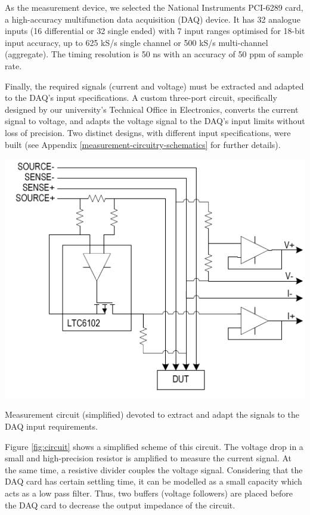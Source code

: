 \documentclass[twoside,nohyper]{tufte-book}
\theoremstyle{definition}
\theoremstyle{definition}
\theoremstyle{definition}
\theoremstyle{remark}
\begin{document}
As the measurement device, we selected the National Instruments PCI-6289
card, a high-accuracy multifunction data acquisition (DAQ) device. It
has 32 analogue inputs (16 differential or 32 single ended) with 7 input
ranges optimised for 18-bit input accuracy, up to 625 kS/s single
channel or 500 kS/s multi-channel (aggregate). The timing resolution is
50 ns with an accuracy of 50 ppm of sample rate.

Finally, the required signals (current and voltage) must be extracted
and adapted to the DAQ's input specifications. A custom three-port
circuit, specifically designed by our university's Technical Office in
Electronics, converts the current signal to voltage, and adapts the
voltage signal to the DAQ's input limits without loss of precision. Two
distinct designs, with different input specifications, were built (see
Appendix \ref{measurement-circuitry-schematics} for further details).




\begin{marginfigure}[-1cm]

{\centering \includegraphics[width=1\linewidth]{img/03/circuit} 

}

\caption[Measurement circuit (simplified) devoted to extract and
adapt the signals to the DAQ input requirements.]{Measurement circuit (simplified) devoted to extract and
adapt the signals to the DAQ input requirements.}\label{fig:circuit}
\end{marginfigure}

Figure \ref{fig:circuit} shows a simplified scheme of this circuit. The
voltage drop in a small and high-precision resistor is amplified to
measure the current signal. At the same time, a resistive divider
couples the voltage signal. Considering that the DAQ card has certain
settling time, it can be modelled as a small capacity which acts as a
low pass filter. Thus, two buffers (voltage followers) are placed before
the DAQ card to decrease the output impedance of the
circuit\cite[0pt]{ni2014}.
\end{document}
